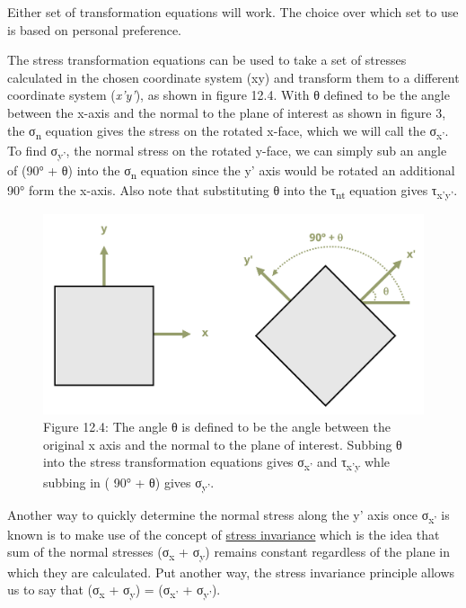 \documentclass[
  letterpaper,
  DIV=11,
  numbers=noendperiod]{scrreprt}
\theoremstyle{definition}
\theoremstyle{remark}
\begin{document}
Either set of transformation equations will work. The choice over which
set to use is based on personal preference.

The stress transformation equations can be used to take a set of
stresses calculated in the chosen coordinate system (xy) and transform
them to a different coordinate system (\emph{x'y'}), as shown in figure
12.4. With θ defined to be the angle between the x-axis and the normal
to the plane of interest as shown in figure 3, the σ\textsubscript{n}
equation gives the stress on the rotated x-face, which we will call the
σ\textsubscript{x'}. To find σ\textsubscript{y'}, the normal stress on
the rotated y-face, we can simply sub an angle of (90° + θ) into the
σ\textsubscript{n} equation since the y' axis would be rotated an
additional 90° form the x-axis. Also note that substituting θ into the
τ\textsubscript{nt} equation gives τ\textsubscript{x'y'}.

\begin{figure}[H]

{\centering \includegraphics[width=4.8125in,height=\textheight]{images/CH12 figures/figure 12.4.png}

}

\caption{Figure 12.4: The angle θ is defined to be the angle between the
original x axis and the normal to the plane of interest. Subbing θ into
the stress transformation equations gives σ\textsubscript{x'} and
τ\textsubscript{x'y} whle subbing in ( 90° + θ) gives
σ\textsubscript{y'}.}

\end{figure}%

Another way to quickly determine the normal stress along the y' axis
once σ\textsubscript{x'} is known is to make use of the concept of
\ul{stress invariance} which is the idea that sum of the normal stresses
(σ\textsubscript{x} + σ\textsubscript{y}) remains constant regardless of
the plane in which they are calculated. Put another way, the stress
invariance principle allows us to say that (σ\textsubscript{x} +
σ\textsubscript{y}) = (σ\textsubscript{x'} + σ\textsubscript{y'}).
\end{document}
